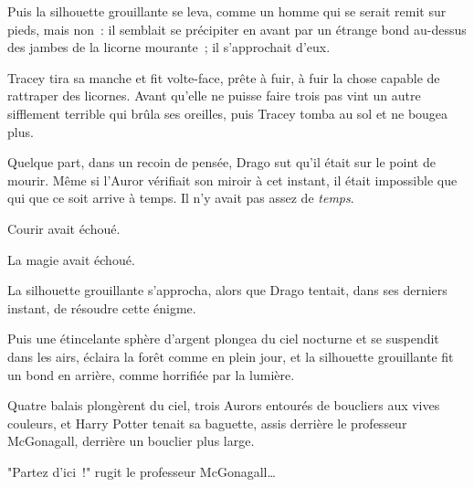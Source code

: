 Puis la silhouette grouillante se leva, comme un homme qui se serait remit sur pieds, mais non~: il semblait se précipiter en avant par un étrange bond au-dessus des jambes de la licorne mourante~; il s'approchait d'eux.

Tracey tira sa manche et fit volte-face, prête à fuir, à fuir la chose capable de rattraper des licornes. Avant qu'elle ne puisse faire trois pas vint un autre sifflement terrible qui brûla ses oreilles, puis Tracey tomba au sol et ne bougea plus.

Quelque part, dans un recoin de pensée, Drago sut qu'il était sur le point de mourir. Même si l'Auror vérifiait son miroir à cet instant, il était impossible que qui que ce soit arrive à temps. Il n'y avait pas assez de \emph{temps}.

Courir avait échoué.

La magie avait échoué.

La silhouette grouillante s'approcha, alors que Drago tentait, dans ses derniers instant, de résoudre cette énigme.

Puis une étincelante sphère d'argent plongea du ciel nocturne et se suspendit dans les airs, éclaira la forêt comme en plein jour, et la silhouette grouillante fit un bond en arrière, comme horrifiée par la lumière.

Quatre balais plongèrent du ciel, trois Aurors entourés de boucliers aux vives couleurs, et Harry Potter tenait sa baguette, assis derrière le professeur McGonagall, derrière un bouclier plus large.

"Partez d'ici~!" rugit le professeur McGonagall…

